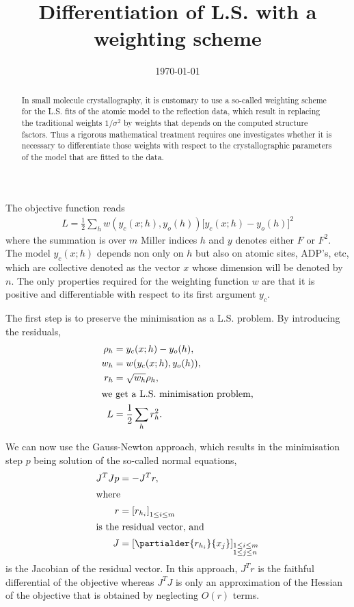 \documentclass[11pt]{article}
\title{Differentiation of L.S. with a weighting scheme}
\author{\lucjbourhis}
\date{\today}
\begin{document}
\maketitle
\begin{abstract}
In small molecule crystallography, it is customary to use a so-called weighting scheme for the L.S. fits of the atomic model to the reflection data, which result in replacing the traditional weights $1/\sigma^2$ by weights that depends on the computed structure factors. Thus a rigorous mathematical treatment requires one investigates whether it is necessary to differentiate those weights with respect to the crystallographic parameters of the model that are fitted to the data. 
\end{abstract}

The objective function reads
\begin{align}
L = \frac{1}{2}\sum_h w(y_c(x; h), y_o(h)) \big[y_c(x;h) - y_o(h)\big]^2
\end{align}
where the summation is over $m$ Miller indices $h$ and $y$ denotes either $F$ or $F^2$. The model $y_c(x;h)$ depends non only on $h$ but also on atomic sites, ADP's, etc, which are collective denoted as the vector $x$ whose dimension will be denoted by $n$. The only properties required for the weighting function $w$ are that it is positive and differentiable with respect to its first argument $y_c$.

The first step is to preserve the minimisation as a L.S. problem. By introducing the residuals,
\begin{align}
\rho_h &= y_c(x;h) - y_o(h),\\
w_h &= w(y_c(x;h), y_o(h)),\\
r_h &= \sqrt{w_h} \rho_h,\\
\intertext{we get a L.S. minimisation problem,}
L &= \frac{1}{2}\sum_h r_h^2.
\end{align}

We can now use the Gauss-Newton approach, which results in the minimisation step $p$ being solution of the so-called normal equations,
\begin{align}
J^T J p &= -J^T r,\\
\intertext{where}
r &= \left[ r_{h_i} \right]_{1\le i \le m}\\
\intertext{is the residual vector, and}
J &= \left[ \partialder{r_{h_i}}{x_j} \right]_{\begin{subarray}{l} 1 \le i \le m\\1 \le j \le n \end{subarray}}
\end{align}
is the Jacobian of the residual vector. In this approach, $J^T r$ is the faithful differential of the objective whereas $J^T J$ is only an approximation of the Hessian of the objective that is obtained by neglecting $O(r)$ terms.
\end{document}
